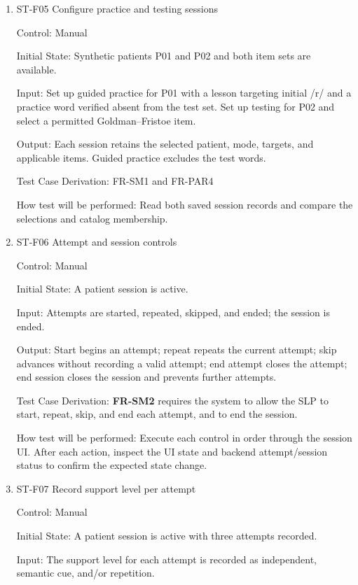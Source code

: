 \documentclass[12pt, titlepage]{article}
\begin{document}
\begin{enumerate}

\item{ST-F05 Configure practice and testing sessions\\}

Control: Manual

Initial State: Synthetic patients P01 and P02 and both item sets are available.

Input: Set up guided practice for P01 with a lesson targeting initial /r/ and a practice word verified absent from the test set. Set up testing for P02 and select a permitted Goldman--Fristoe item.

Output: Each session retains the selected patient, mode, targets, and applicable items. Guided practice excludes the test words.

Test Case Derivation: FR-SM1 and FR-PAR4

How test will be performed: Read both saved session records and compare the selections and catalog membership.

\item{ST-F06 Attempt and session controls\\}

Control: Manual

Initial State: A patient session is active.

Input: Attempts are started, repeated, skipped, and ended; the session is ended.

Output: Start begins an attempt; repeat repeats the current attempt; skip advances without recording a valid attempt; end attempt closes 
the attempt; end session closes the session and prevents further attempts.

Test Case Derivation: \textbf{FR-SM2} requires the system to allow the SLP to start, repeat, skip, and end each attempt, and to end the 
session.

How test will be performed: Execute each control in order through the session UI. After each action, inspect the UI state and backend 
attempt/session status to confirm the expected state change.

\item{ST-F07 Record support level per attempt\\}

Control: Manual

Initial State: A patient session is active with three attempts recorded.

Input: The support level for each attempt is recorded as independent, semantic cue, and/or repetition.


\end{enumerate}
\end{document}
